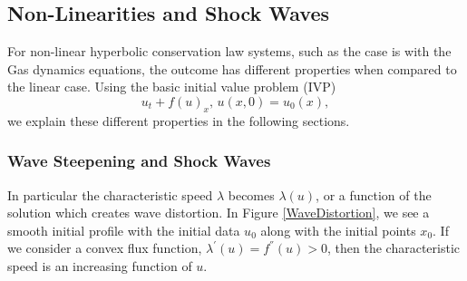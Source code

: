 \documentclass[]{article}
\begin{document}
	\subsection{Non-Linearities and Shock Waves}
		For non-linear hyperbolic conservation law systems, such as the case is with the Gas dynamics equations, the outcome has different properties when compared to the linear case. Using the basic initial value problem (IVP)
		\begin{equation}
			u_t + f(u)_x  \mbox{, } u(x,0) = u_0(x),
			\label{IVP1}
		\end{equation} we explain these different properties in the following sections.
	
		\subsubsection{Wave Steepening and Shock Waves}
			In particular the characteristic speed $ \lambda $ becomes $ \lambda(u) $, or a function of the solution which creates wave distortion. In Figure \ref{WaveDistortion}, we see a smooth initial profile with the initial data $ u_0 $ along with the initial points $ x_0 $. If we consider a convex flux function, $ \lambda^{'}(u) = f^{''}(u) > 0 $, then the characteristic speed  is an increasing function of $ u $.
	 
\end{document}

